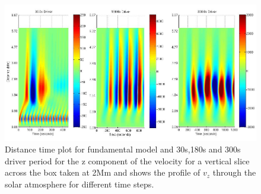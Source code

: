 \documentclass{aa}
\begin{document}



\begin{figure}[h]\label{fig4_dt_30_180_300_0_vert_2Mm}
\includegraphics[scale=0.5]{images/fig4_dt_30_180_300_0_vert_2Mm.jpg}
\caption{Distance time plot for fundamental model and 30s,180s and 300s driver period for the z component of the velocity for a vertical slice across the box  taken at 2Mm and shows  the profile of $v_{z}$ through the solar atmosphere for different time steps. }
\end{figure}


\end{document}
